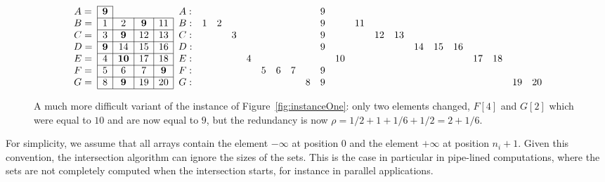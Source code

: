 \begin{figure}
$$
\begin{array}{c|c|c|c|c|c|c|c|c|c|c|c|c|c|c|c|c|c|c|c|c|c|c|c|c|c}\cline{2-2}
A=& \bf 9\\ \cline{2-5}
B=& 1& 2&\bf  9&11\\ \cline{2-5}
C=& 3&\bf  9&12&13\\ \cline{2-5}
D=&\bf  9&14&15&16\\ \cline{2-5}
E=& 4&\bf 10&17&18\\ \cline{2-5}
F=& 5& 6& 7&\bf 9\\ \cline{2-5}
G=& 8&\bf 9&19&20\\ \cline{2-5}
\end{array}
\hfill
\begin{array}{cccccccccccccccccccccccccc}
A:&  &  &  &  &  &  &  &  & 9&  &  &  &  &  &  &  &  &  &  &  \\
B:& 1& 2&  &  &  &  &  &  & 9&  &11&  &  &  &  &  &  &  &  &  \\
C:&  &  & 3&  &  &  &  &  & 9&  &  &12&13&  &  &  &  &  &  &  \\
D:&  &  &  &  &  &  &  &  & 9&  &  &  &  &14&15&16&  &  &  &  \\
E:&  &  &  & 4&  &  &  &  &  &10&  &  &  &  &  &  &17&18&  &  \\
F:&  &  &  &  & 5& 6& 7&  & 9&  &  &  &  &  &  &  &  &  &  &  \\
G:&  &  &  &  &  &  &  & 8& 9&  &  &  &  &  &  &  &  &  &19&20\\
\end{array}
$$ 
\caption{A much more difficult variant of the instance of
Figure~\ref{fig:instanceOne}: only two elements changed, $F[4]$ and
$G[2]$ which were equal to $10$ and are now equal to $9$, but the
redundancy is now
$\rho={1/2}{+}1{+}{1/6}{+}{1/2}=2{+}{1/6}$.
}\label{fig:instanceTwo}
\end{figure}





For simplicity, we assume that all arrays contain the element
$-\infty$ at position $0$ and the element $+\infty$ at position
$n_i{+}1$.
%
Given this convention, the intersection algorithm can ignore the sizes
of the sets.
%
This is the case in particular in pipe-lined computations, where the
sets are not completely computed when the intersection starts, for
instance in parallel applications.



